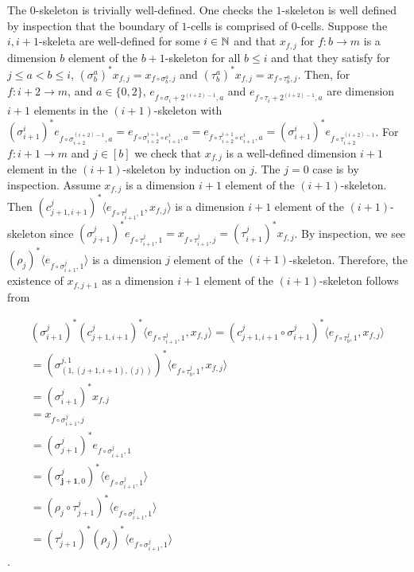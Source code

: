 The $0$-skeleton is trivially well-defined. One checks the $1$-skeleton is well defined by inspection that the boundary of $1$-cells is comprised of $0$-cells. Suppose the $i, i+1$-skeleta are well-defined for some $i \in \mathbb{N}$ and that $x_{f, j}$ for $f \colon b \to m$ is a dimension $b$ element of the $b + 1$-skeleton for all $b \leq i$ and that they satisfy for $j \leq a < b \leq i$, $(\sigma^a_b)^* x_{f, j} = x_{f \circ \sigma^a_b, j}$ and $(\tau^a_b)^* x_{f, j} = x_{f \circ \tau^a_b, j}$. Then, for $f \colon i+ 2 \to m$, and $a \in \{0, 2\}$, $e_{f \circ \sigma_i+2^{(i+2)-1}, a}$ and $e_{f \circ \tau_i+2^{(i+2)-1}, a}$ are dimension $i + 1$ elements in the $(i+1)$-skeleton with $(\sigma^i_{i+1})^* e_{f \circ \sigma_{i+2}^{(i+2)-1}, a} = e_{f \circ \sigma_{i+2}^{i+1} \circ e^i_{i+1}, a} = e_{f \circ \tau_{i+2}^{i+1} \circ e^i_{i+1}, a} = (\sigma_{i+1}^i)^* e_{f \circ \tau_{i+2}^{(i+2)-1}}$. For $f \colon i + 1 \to m$ and $j \in [b]$ we check that $x_{f,j}$ is a well-defined dimension $i + 1$ element in the $(i + 1)$-skeleton by induction on $j$. The $j = 0$ case is by inspection. Assume $x_{f, j}$ is a dimension $i + 1$ element of the $(i + 1)$-skeleton. Then $(c^j_{j+1, i + 1})^* \langle e_{f \circ \tau^j_{i + 1}, 1}, x_{f, j} \rangle$ is a dimension $i + 1$ element of the $(i + 1)$-skeleton since $(\sigma^{j}_{j+1})^* e_{f \circ \tau^j_{i + 1}, 1} = x_{f \circ \tau^j_{i+1}, j} = (\tau^j_{i+1})^* x_{f, j}$. By inspection, we see $(\rho_{j})^* \langle e_{f \circ \sigma^j_{i+1}, 1} \rangle$ is a dimension $j$ element of the $(i + 1)$-skeleton. Therefore, the existence of $x_{f, j+1}$ as a dimension $i + 1$ element of the $(i + 1)$-skeleton follows from 

\begin{align*}(\sigma^j_{i +1})^*(c^j_{j+1, {i+1}})^* \langle e_{f \circ \tau^j_{i+1}, 1}, x_{f, j} \rangle = (c^j_{j+1, {i+1}} \circ \sigma^j_{i+1})^*\langle e_{f \circ \tau^j_b, 1}, x_{f, j} \rangle \\= (\sigma^{j, 1}_{(1, (j+1, i+1), (j))})^* \langle e_{f \circ \tau^j_b, 1}, x_{f, j} \rangle \\= (\sigma^j_{i+1})^* x_{f, j} \\= x_{f \circ \sigma^j_{i+1}, j} \\= (\sigma^j_{j+1})^* e_{f \circ \sigma^j_{i+1}, 1} \\ = (\sigma^j_{\mathbf{j + 1}, 0})^* \langle e_{f \circ \sigma^j_{i+1}, 1} \rangle \\ = (\rho_{j} \circ \tau^j_{j+1})^* \langle e_{f \circ \sigma^j_{i+1}, 1} \rangle \\= (\tau^j_{j+1})^* (\rho_{j})^* \langle e_{f \circ \sigma^j_{i+1}, 1} \rangle\end{align*}.

